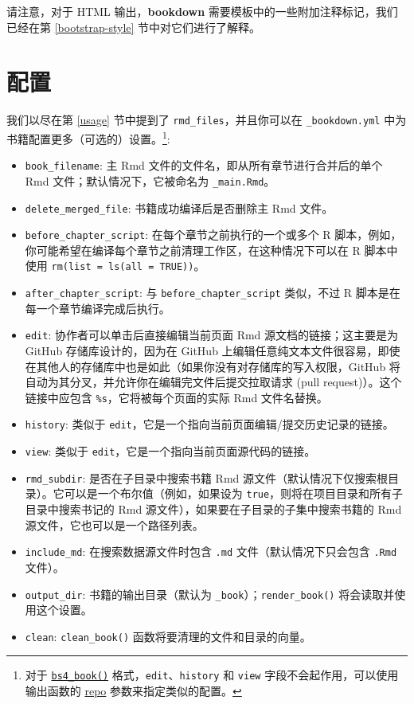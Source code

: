 \documentclass[
  12pt,
]{krantz}
\providecommand{\tightlist}{%
  \setlength{\itemsep}{0pt}\setlength{\parskip}{0pt}}
\theoremstyle{definition}
\theoremstyle{definition}
\theoremstyle{definition}
\theoremstyle{definition}
\theoremstyle{remark}
\begin{document}
请注意，对于 HTML 输出，\textbf{bookdown} 需要模板中的一些附加注释标记，我们已经在第 \ref{bootstrap-style} 节中对它们进行了解释。

\section{配置}\label{configuration}

我们以尽在第 \ref{usage} 节中提到了 \texttt{rmd\_files}，并且你可以在 \texttt{\_bookdown.yml} 中为书籍配置更多（可选的）设置。\footnote{对于 \hyperref[bs4-book]{\texttt{bs4\_book()}} 格式，\texttt{edit}、\texttt{history} 和 \texttt{view} 字段不会起作用，可以使用输出函数的 \hyperref[specifying-the-repository]{repo} 参数来指定类似的配置。}:

\begin{itemize}
\tightlist
\item
  \texttt{book\_filename}: 主 Rmd 文件的文件名，即从所有章节进行合并后的单个 Rmd 文件；默认情况下，它被命名为 \texttt{\_main.Rmd}。
\item
  \texttt{delete\_merged\_file}: 书籍成功编译后是否删除主 Rmd 文件。
\item
  \texttt{before\_chapter\_script}: 在每个章节之前执行的一个或多个 R 脚本，例如，你可能希望在编译每个章节之前清理工作区，在这种情况下可以在 R 脚本中使用 \texttt{rm(list\ =\ ls(all\ =\ TRUE))}。
\item
  \texttt{after\_chapter\_script}: 与 \texttt{before\_chapter\_script} 类似，不过 R 脚本是在每一个章节编译完成后执行。
\item
  \texttt{edit}: 协作者可以单击后直接编辑当前页面 Rmd 源文档的链接；这主要是为 GitHub 存储库设计的，因为在 GitHub 上编辑任意纯文本文件很容易，即使在其他人的存储库中也是如此（如果你没有对存储库的写入权限，GitHub 将自动为其分叉，并允许你在编辑完文件后提交拉取请求 (pull request)）。这个链接中应包含 \texttt{\%s}，它将被每个页面的实际 Rmd 文件名替换。
\item
  \texttt{history}: 类似于 \texttt{edit}，它是一个指向当前页面编辑/提交历史记录的链接。
\item
  \texttt{view}: 类似于 \texttt{edit}，它是一个指向当前页面源代码的链接。
\item
  \texttt{rmd\_subdir}: 是否在子目录中搜索书籍 Rmd 源文件（默认情况下仅搜索根目录）。它可以是一个布尔值（例如，如果设为 \texttt{true}，则将在项目目录和所有子目录中搜索书记的 Rmd 源文件），如果要在子目录的子集中搜索书籍的 Rmd 源文件，它也可以是一个路径列表。
\item
  \texttt{include\_md}: 在搜索数据源文件时包含 \texttt{.md} 文件（默认情况下只会包含 \texttt{.Rmd} 文件）。
\item
  \texttt{output\_dir}: 书籍的输出目录（默认为 \texttt{\_book}）；\texttt{render\_book()} 将会读取并使用这个设置。
\item
  \texttt{clean}: \texttt{clean\_book()} 函数将要清理的文件和目录的向量。
\end{itemize}
\end{document}
